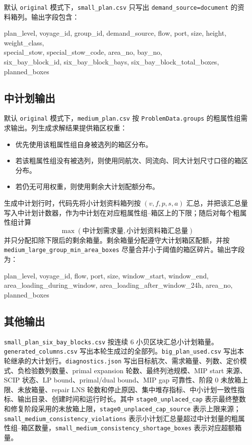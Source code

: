\documentclass[UTF8,a4paper,11pt]{ctexart}
\newcommand{\code}[1]{\nolinkurl{#1}}
\begin{document}
默认 \code{original} 模式下，\code{small_plan.csv} 只写出 \code{demand_source=document} 的资料箱列。输出字段包含：
\begin{flushleft}\small\ttfamily
plan\_level, voyage\_id, group\_id, demand\_source, flow, port, size, height, weight\_class,\\
special\_stow, special\_stow\_code, area\_no, bay\_no,\\
six\_bay\_block\_id, six\_bay\_block\_bays, six\_bay\_block\_total\_boxes, planned\_boxes
\end{flushleft}

\subsection{中计划输出}

默认 \code{original} 模式下，\code{medium_plan.csv} 按 \code{ProblemData.groups} 的粗属性组需求输出。列生成求解结果提供箱区权重：
\begin{itemize}
  \item 优先使用该粗属性组自身被选列的箱区分布。
  \item 若该粗属性组没有被选列，则使用同航次、同流向、同大计划尺寸口径的箱区分布。
  \item 若仍无可用权重，则使用剩余大计划配额分布。
\end{itemize}

生成中计划行时，代码先将小计划资料箱列按 \((v,f,p,s,a)\) 汇总，并把该汇总量写入中计划计数器，作为中计划在对应粗属性组--箱区上的下限；随后对每个粗属性组计算
\[
\max(\text{中计划需求量},\text{小计划资料箱汇总量})
\]
并只分配扣除下限后的剩余箱量。剩余箱量分配遵守大计划箱区配额，并按 \code{medium_large_group_min_area_boxes} 尽量合并小于阈值的箱区碎片。输出字段为：
\begin{flushleft}\small\ttfamily
plan\_level, voyage\_id, flow, port, size, window\_start, window\_end,\\
area\_loading\_during\_window, area\_loading\_after\_window\_24h, area\_no, planned\_boxes
\end{flushleft}

\subsection{其他输出}

\code{small_plan_six_bay_blocks.csv} 按连续 6 小贝区块汇总小计划箱量。\code{generated_columns.csv} 写出本轮生成过的全部列。\code{big_plan_used.csv} 写出本轮继承的大计划行。\code{diagnostics.json} 写出目标航次、需求箱量、列数、定价模式、负检验数列数量、primal expansion 轮数、最终列池规模、MIP start 来源、SCIP 状态、LP bound、primal/dual bound、MIP gap 可靠性、阶段 0 未放箱上限、未放箱量、repair LNS 轮数和停止原因、集中堆存指标、中小计划一致性指标、输出目录、创建时间和运行时长。其中 \code{stage0_unplaced_cap} 表示最终整数和修复阶段采用的未放箱上限，\code{stage0_unplaced_cap_source} 表示上限来源；\code{small_medium_consistency_violations} 表示小计划汇总量超过中计划量的粗属性组--箱区数量，\code{small_medium_consistency_shortage_boxes} 表示对应超额箱量。
\end{document}
